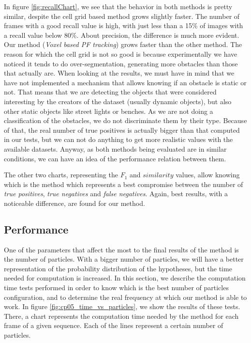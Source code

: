 In figure \ref{fig:recallChart}, we see that the behavior in both methods is pretty similar, despite the cell grid based method grows slightly faster. The number of frames with a good recall value is high, with just less than a 15\% of images with a recall value below 80\%. About precision, the difference is much more evident. Our method (\emph{Voxel based PF tracking}) grows faster than the other method. The reason for which the cell grid is not so good is because experimentally we have noticed it tends to do over-segmentation, generating more obstacles than those that actually are. When looking at the results, we must have in mind that we have not implemented a mechanism that allows knowing if an obstacle is static or not. That means that we are detecting the objects that were considered interesting by the creators of the dataset (usually dynamic objects), but also other static objects like street lights or benches. As we are not doing a classification of the obstacles, we do not discriminate them by their type. Because of that, the real number of true positives is actually bigger than that computed in our tests, but we can not do anything to get more realistic values with the available datasets. Anyway, as both methods being evaluated are in similar conditions, we can have an idea of the performance relation between them.

The other two charts, representing the $F_1$ and $similarity$ values, allow knowing which is the method which represents a best compromise between the number of \emph{true positives}, \emph{true negatives} and \emph{false negatives}. Again, best results, with a noticeable difference, are found for our method.

\subsection{Performance}\label{ch:chapter05_02_04}

One of the parameters that affect the most to the final results of the method is the number of particles. With a bigger number of particles, we will have a better representation of the probability distribution of the hypotheses, but the time needed for computation is increased. In this section, we describe the computation time tests performed in order to know which is the best number of particles configuration, and to determine the real frequency at which our method is able to work.
In figure \ref{fig:cp05_time_vs_particles}, we show the results of these tests. There, a chart represents the computation time needed by the method for each frame of a given sequence. Each of the lines represent a certain number of particles.

